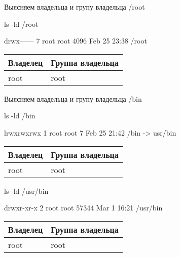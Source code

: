 Выясняем владельца и групу владельца /root

\begin{BashBox}
    ls -ld /root
\end{BashBox}

\begin{OutBox}
    drwx------ 7 root root 4096 Feb 25 23:38 /root
\end{OutBox}

\begin{table}[h!]
    \centering
    \begin{tabular}{ | l | l | }
        \hline
        Владелец& Группа владельца  \\ \hline
        \hline
        root    & root              \\ \hline
    \end{tabular}
\end{table}

Выясняем владельца и групу владельца /bin

\begin{BashBox}
    ls -ld /bin
\end{BashBox}

\begin{OutBox}
    lrwxrwxrwx 1 root root 7 Feb 25 21:42 /bin -> usr/bin
\end{OutBox}

\begin{table}[h!]
    \centering
    \begin{tabular}{ | l | l | }
        \hline
        Владелец& Группа владельца  \\ \hline
        \hline
        root    & root              \\ \hline
    \end{tabular}
\end{table}

\begin{BashBox}
    ls -ld /usr/bin
\end{BashBox}

\begin{OutBox}
    drwxr-xr-x 2 root root 57344 Mar  1 16:21 /usr/bin
\end{OutBox}

\begin{table}[h!]
    \centering
    \begin{tabular}{ | l | l | }
        \hline
        Владелец& Группа владельца  \\ \hline
        \hline
        root    & root              \\ \hline
    \end{tabular}
\end{table}

